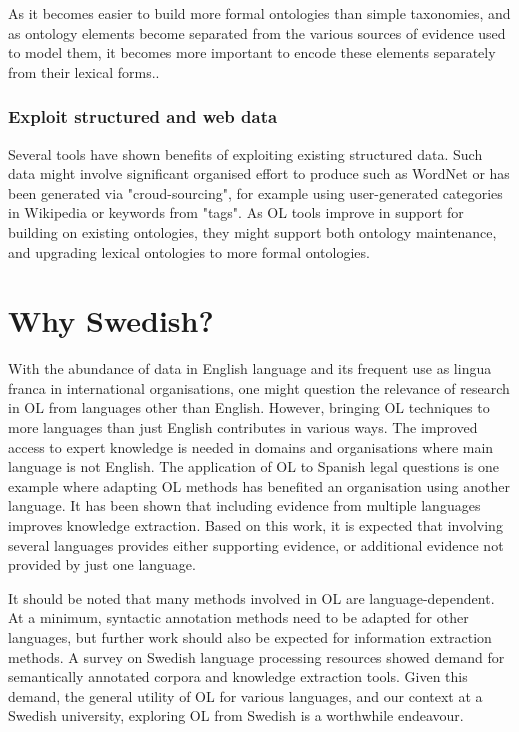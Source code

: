 \documentclass[a4paper]{report}
\newcommand{\todo}[1]{}
\begin{document}
As it becomes easier to build more formal ontologies than simple taxonomies, and as ontology elements become separated from the various sources of evidence used to model them, it becomes more important to encode these elements separately from their lexical forms.\cite{Wong11Survey}.

\subsubsection{Exploit structured and web data}

Several tools have shown benefits of exploiting existing structured data.
Such data might involve significant organised effort to produce such as WordNet\cite{Fellbaum98WordNet} or has been generated via "croud-sourcing", for example using user-generated categories in Wikipedia or keywords from "tags"\cite{Wong11Survey}.
As OL tools improve in support for building on existing ontologies, they might support both ontology maintenance, and upgrading lexical ontologies to more formal ontologies\cite{Wong11Survey}.

\section{Why Swedish?}
\label{sec:background:swedish}

With the abundance of data in English language and its frequent use as lingua franca in international organisations, one might question the relevance of research in OL from languages other than English.
However, bringing OL techniques to more languages than just English contributes in various ways.
The improved access to expert knowledge is needed in domains and organisations where main language is not English.
The application of OL to Spanish legal questions is one example where adapting OL methods has benefited an organisation using another language\cite{Voelkner2008Spanish}.
It has been shown that including evidence from multiple languages improves knowledge extraction\cite{Hjelm09Thesis}.
Based on this work, it is expected that involving several languages provides either supporting evidence, or additional evidence not provided by just one language\cite{Hjelm09Thesis}.
\todo{Ontology localization could be included if we need more justification here.}
It should be noted that many methods involved in OL are language-dependent.
At a minimum, syntactic annotation methods need to be adapted for other languages, but further work should also be expected for information extraction methods.
A survey on Swedish language processing resources showed demand for semantically annotated corpora and knowledge extraction tools\cite{EleniusEtAl08SwedTools}.
Given this demand, the general utility of OL for various languages, and our context at a Swedish university, exploring OL from Swedish is a worthwhile endeavour.
\end{document}
